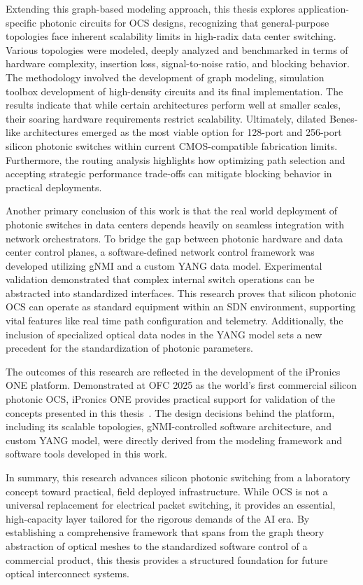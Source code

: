 Extending this graph-based modeling approach, this thesis explores application-specific photonic circuits for OCS designs, recognizing that general-purpose topologies face inherent scalability limits in high-radix data center switching.
Various topologies were modeled, deeply analyzed and benchmarked in terms of hardware complexity, insertion loss, signal-to-noise ratio, and blocking behavior.
The methodology involved the development of graph modeling, simulation toolbox development of high-density circuits and its final implementation.
The results indicate that while certain architectures perform well at smaller scales, their soaring hardware requirements restrict scalability.
Ultimately, dilated Benes-like architectures emerged as the most viable option for 128-port and 256-port silicon photonic switches within current CMOS-compatible fabrication limits.
Furthermore, the routing analysis highlights how optimizing path selection and accepting strategic performance trade-offs can mitigate blocking behavior in practical deployments.

Another primary conclusion of this work is that the real world deployment of photonic switches in data centers depends heavily on seamless integration with network orchestrators.
To bridge the gap between photonic hardware and data center control planes, a software-defined network control framework was developed utilizing gNMI and a custom YANG data model.
Experimental validation demonstrated that complex internal switch operations can be abstracted into standardized interfaces.
This research proves that silicon photonic OCS can operate as standard equipment within an SDN environment, supporting vital features like real time path configuration and telemetry.
Additionally, the inclusion of specialized optical data nodes in the YANG model sets a new precedent for the standardization of photonic parameters.

The outcomes of this research are reflected in the development of the iPronics ONE platform.
Demonstrated at OFC 2025 as the world's first commercial silicon photonic OCS, iPronics ONE provides practical support for validation of the concepts presented in this thesis~\cite{ipronics_one32_2025}.
The design decisions behind the platform, including its scalable topologies, gNMI-controlled software architecture, and custom YANG model, were directly derived from the modeling framework and software tools developed in this work.

In summary, this research advances silicon photonic switching from a laboratory concept toward practical, field deployed infrastructure.
While OCS is not a universal replacement for electrical packet switching, it provides an essential, high-capacity layer tailored for the rigorous demands of the AI era.
By establishing a comprehensive framework that spans from the graph theory abstraction of optical meshes to the standardized software control of a commercial product, this thesis provides a structured foundation for future optical interconnect systems.
